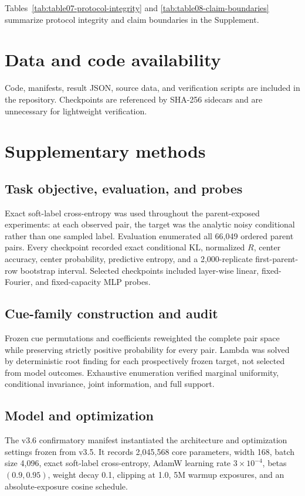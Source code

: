 \documentclass[11pt]{article}
\begin{document}
Tables~\ref{tab:table07-protocol-integrity} and
\ref{tab:table08-claim-boundaries} summarize protocol integrity and claim
boundaries in the Supplement.

\section{Data and code availability}
Code, manifests, result JSON, source data, and verification scripts are
included in the repository. Checkpoints are referenced by SHA-256 sidecars and
are unnecessary for lightweight verification.

\section{Supplementary methods}
\subsection{Task objective, evaluation, and probes}
Exact soft-label cross-entropy was used throughout the parent-exposed
experiments: at each observed pair, the target was the analytic noisy
conditional rather than one sampled label. Evaluation enumerated all
66,049 ordered parent pairs. Every checkpoint recorded exact conditional KL,
normalized $R$, center accuracy, center probability, predictive entropy, and a
2,000-replicate first-parent-row bootstrap interval. Selected checkpoints
included layer-wise linear, fixed-Fourier, and fixed-capacity MLP probes.

\subsection{Cue-family construction and audit}
Frozen cue permutations and coefficients reweighted the complete pair space
while preserving strictly positive probability for every pair. Lambda was
solved by deterministic root finding for each prospectively frozen target, not
selected from model outcomes. Exhaustive enumeration verified marginal
uniformity, conditional invariance, joint information, and full support.

\subsection{Model and optimization}
The v3.6 confirmatory manifest instantiated the architecture and optimization
settings frozen from v3.5. It records
2,045,568 core
parameters, width 168, batch size
4,096, exact soft-label cross-entropy, AdamW
learning rate $3\times10^{-4}$,
betas
$(0.9,0.95)$, weight decay
0.1, clipping at 1.0,
5M warmup exposures, and an
absolute-exposure cosine schedule.
\end{document}
